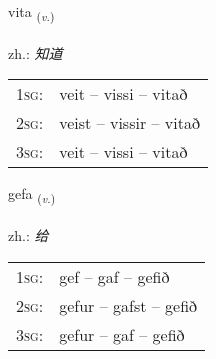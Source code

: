 \documentclass[frontgrid, backgrid]{flacards}\usepackage[]{graphicx}\usepackage[]{xcolor}
\begin{document}
\renewcommand{\flhead}{\vskip5pt \fboxsep=0pt {\small\bfseries\footnotesize Sagnorð | 动词}}
\renewcommand{\fcfoot}{\vskip5pt \fboxsep=0pt \hspace{2pt}{\small\bfseries\footnotesize 1K}}

\renewcommand{\blhead}{\vskip5pt {\small\bfseries\footnotesize Sagnorð | 动词 }}
\renewcommand{\bcfoot}{\vskip5pt \hspace{2pt}{\small\bfseries\footnotesize 1K}}


{vita \small{\textsubscript{(\textit{v.})}} \\[1ex] %
\textphonetic{[vɪːta]} \\
zh.: \emph{知道} \\  [2ex]
\renewcommand*{\arraystretch}{0.8}
\begin{tabular}{p{1cm}l}
\textsc{1sg}: & veit -- vissi -- vitað \\ 
\textsc{2sg}: & veist -- vissir -- vitað \\ 
\textsc{3sg}: & veit -- vissi -- vitað \\ 
\end{tabular}
}

\renewcommand{\flhead}{\vskip5pt \fboxsep=0pt {\small\bfseries\footnotesize Sagnorð | 动词}}
\renewcommand{\fcfoot}{\vskip5pt \fboxsep=0pt \hspace{2pt}{\small\bfseries\footnotesize 1K}}

\renewcommand{\blhead}{\vskip5pt {\small\bfseries\footnotesize Sagnorð | 动词 }}
\renewcommand{\bcfoot}{\vskip5pt \hspace{2pt}{\small\bfseries\footnotesize 1K}}


{gefa \small{\textsubscript{(\textit{v.})}} \\[1ex] %
\textphonetic{[cɛːva]} \\
zh.: \emph{给} \\  [2ex]
\renewcommand*{\arraystretch}{0.8}
\begin{tabular}{p{1cm}l}
\textsc{1sg}: & gef -- gaf -- gefið \\ 
\textsc{2sg}: & gefur -- gafst -- gefið \\ 
\textsc{3sg}: & gefur -- gaf -- gefið \\ 
\end{tabular}
}
\end{document}
